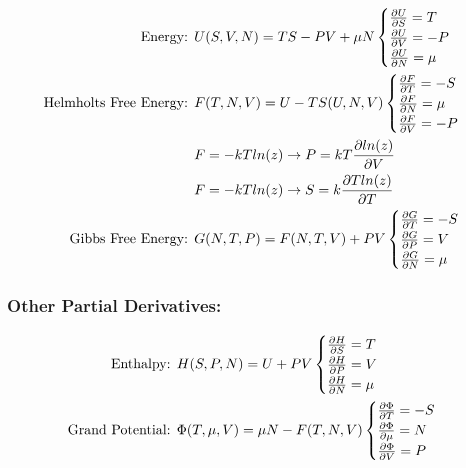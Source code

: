 \begin{align}
	\text{Energy: }                & U(S, V, N) = TS - PV + \mu N
	\begin{cases}
		\pdv{U}{S} = T   \\
		\pdv{U}{V} = -P  \\
		\pdv{U}{N} = \mu \\
	\end{cases}                                                                     \\
	\text{Helmholts Free Energy: } & F(T, N, V) = U - T S(U, N, V)
	\begin{cases}
		\pdv{F}{T} = -S  \\
		\pdv{F}{N} = \mu \\
		\pdv{F}{V} = -P  \\
	\end{cases}                                                                     \\
	                               & F = -k T ln(z) \rightarrow P = k T \pdv{ln(z)}{V}   \\
	                               & F = -k T ln(z) \rightarrow S = k \pdv{T ln(z)}{T} \\
	\text{Gibbs Free Energy: }     & G(N, T, P) = F(N, T, V) + PV
	\begin{cases}
		\pdv{G}{T} = -S  \\
		\pdv{G}{P} = V   \\
		\pdv{G}{N} = \mu \\
	\end{cases}                                                                     \\
\end{align}

\subsubsection*{Other Partial Derivatives:}

\begin{align}
	\text{Enthalpy: }        & H(S, P, N) = U + PV
	\begin{cases}
		\pdv{H}{S} = T   \\
		\pdv{H}{P} = V   \\
		\pdv{H}{N} = \mu \\
	\end{cases}                                                \\
	\text{Grand Potential: } & \Phi(T, \mu, V) = \mu N - F(T, N, V)
	\begin{cases}
		\pdv{\Phi}{T} = -S   \\
		\pdv{\Phi}{\mu} = N \\
		\pdv{\Phi}{V} = P   \\
	\end{cases}
\end{align}

